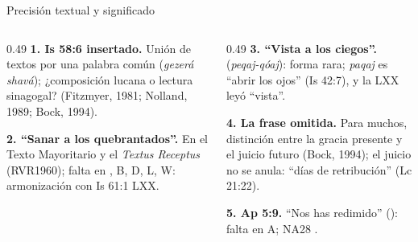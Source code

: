 \begin{frame}{Precisión textual y significado}
\begin{columns}[t,onlytextwidth]
\begin{column}{0.49\textwidth}\scriptsize\RaggedRight
\textbf{\textcolor{tierraroja}{1. Is 58:6 insertado.}} Unión de textos por una palabra común (\emph{gezerá shavá}); ¿composición lucana o lectura sinagogal? (Fitzmyer, 1981; Nolland, 1989; Bock, 1994).\par\medskip
\textbf{\textcolor{tierraroja}{2. ``Sanar a los quebrantados''.}} En el Texto Mayoritario y el \emph{Textus Receptus} (RVR1960); falta en , B, D, L, W: armonización con Is 61:1 LXX.
\end{column}
\begin{column}{0.49\textwidth}\scriptsize\RaggedRight
\textbf{\textcolor{tierraroja}{3. ``Vista a los ciegos''.}}  (\emph{peqaj-qóaj}): forma rara; \emph{paqaj} es ``abrir los ojos'' (Is 42:7), y la LXX leyó ``vista''.\par\medskip
\textbf{\textcolor{tierraroja}{4. La frase omitida.}} Para muchos, distinción entre la gracia presente y el juicio futuro (Bock, 1994); el juicio no se anula: ``días de retribución'' (Lc 21:22).\par\medskip
\textbf{\textcolor{tierraroja}{5. Ap 5:9.}} ``Nos has redimido'' (): falta en A; NA28 .
\end{column}
\end{columns}
\end{frame}

